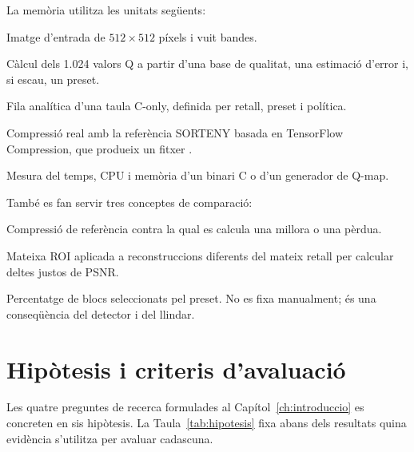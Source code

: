 La memòria utilitza les unitats següents:

\begin{description}[leftmargin=3.1cm,style=nextline]
  \item[Retall] Imatge d'entrada de $512\times512$ píxels i vuit bandes.
  \item[Generació de Q-map] Càlcul dels 1.024 valors Q a partir d'una base de
  qualitat, una estimació d'error i, si escau, un preset.
  \item[Registre] Fila analítica d'una taula C-only, definida per retall, preset
  i política.
  \item[Subcas CSMR] Compressió real amb la referència SORTENY basada en
  TensorFlow Compression, que produeix un fitxer .
  \item[Execució temporitzada] Mesura del temps, CPU i memòria d'un binari C o
  d'un generador de Q-map.
\end{description}

També es fan servir tres conceptes de comparació:

\begin{description}[leftmargin=3.1cm,style=nextline]
  \item[Baseline] Compressió de referència contra la qual es calcula una millora
  o una pèrdua.
  \item[Màscara comuna] Mateixa ROI aplicada a reconstruccions diferents del
  mateix retall per calcular deltes justos de PSNR.
  \item[Cobertura ROI] Percentatge de blocs seleccionats pel preset. No es fixa
  manualment; és una conseqüència del detector i del llindar.
\end{description}

\section{Hipòtesis i criteris d'avaluació}\label{sec:hipotesis}

Les quatre preguntes de recerca formulades al Capítol~\ref{ch:introduccio} es
concreten en sis hipòtesis. La Taula~\ref{tab:hipotesis} fixa abans dels
resultats quina evidència s'utilitza per avaluar cadascuna.

